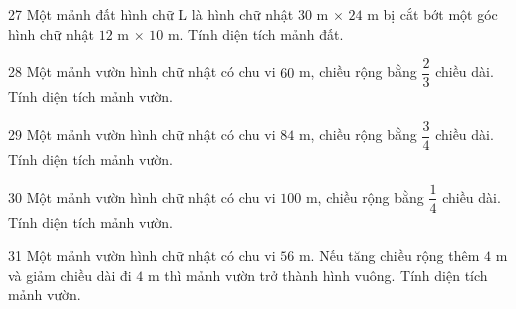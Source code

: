 \gap
\begin{probbox}{27}{\relax}
Một mảnh đất hình chữ L là hình chữ nhật $30$ m $\times$ $24$ m bị cắt bớt một góc hình chữ nhật $12$ m $\times$ $10$ m. Tính diện tích mảnh đất.
\end{probbox}
\gap
\begin{probbox}{28}{\relax}
Một mảnh vườn hình chữ nhật có chu vi $60$ m, chiều rộng bằng $\dfrac{2}{3}$ chiều dài. Tính diện tích mảnh vườn.
\end{probbox}
\gap
\begin{probbox}{29}{\relax}
Một mảnh vườn hình chữ nhật có chu vi $84$ m, chiều rộng bằng $\dfrac{3}{4}$ chiều dài. Tính diện tích mảnh vườn.
\end{probbox}
\gap
\begin{probbox}{30}{\relax}
Một mảnh vườn hình chữ nhật có chu vi $100$ m, chiều rộng bằng $\dfrac{1}{4}$ chiều dài. Tính diện tích mảnh vườn.
\end{probbox}
\begin{probbox}{31}{}
Một mảnh vườn hình chữ nhật có chu vi $56$ m. Nếu tăng chiều rộng thêm $4$ m và giảm chiều dài đi $4$ m thì mảnh vườn trở thành hình vuông. Tính diện tích mảnh vườn.
\end{probbox}
